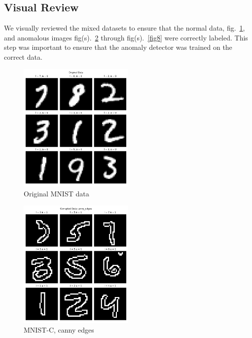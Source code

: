 \subsection{Visual Review}
We visually reviewed the mixed datasets to ensure that the normal data, fig.~\ref{fig1}, and anomalous images fig(s).~\ref{fig2} through fig(s).~\ref{fig8} were correctly labeled. This step was important to ensure that the anomaly detector was trained on the correct data.\par
\begin{figure}[htbp]
    \centerline{\includegraphics[width=0.5\textwidth]{resources/original_data.png}}
    \caption{Original MNIST data}\label{fig1}
\end{figure}

\begin{figure}[htbp]
    \centerline{\includegraphics[width=0.5\textwidth]{resources/corrupted_data_canny_edges.png}}
    \caption{MNIST-C, canny edges}\label{fig2}
\end{figure}

